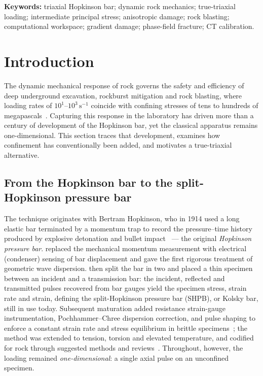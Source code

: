 \documentclass[11pt]{article}
\begin{document}
\noindent\textbf{Keywords:} triaxial Hopkinson bar; dynamic rock mechanics;
true-triaxial loading; intermediate principal stress; anisotropic damage; rock
blasting; computational workspace; gradient damage; phase-field fracture; CT
calibration.

\section{Introduction}\label{sec:intro}

The dynamic mechanical response of rock governs the safety and efficiency of
deep underground excavation, rockburst mitigation and rock blasting, where
loading rates of $10^{1}$--$10^{3}\,\mathrm{s}^{-1}$ coincide with confining
stresses of tens to hundreds of megapascals~\citep{zhang2014,WANG2026106436}. Capturing
this response in the laboratory has driven more than a century of development of
the Hopkinson bar, yet the classical apparatus remains one-dimensional. This
section traces that development, examines how confinement has conventionally been
added, and motivates a true-triaxial alternative.

\subsection{From the Hopkinson bar to the split-Hopkinson pressure bar}

The technique originates with Bertram Hopkinson, who in 1914 used a long elastic
bar terminated by a momentum trap to record the pressure--time history produced
by explosive detonation and bullet impact~\citep{hopkinson1914} --- the original
\emph{Hopkinson pressure bar}. \citet{davies1948} replaced the mechanical
momentum measurement with electrical (condenser) sensing of bar displacement and
gave the first rigorous treatment of geometric wave dispersion.
\citet{kolsky1949} then split the bar in two and placed a thin specimen between
an incident and a transmission bar: the incident, reflected and transmitted
pulses recovered from bar gauges yield the specimen stress, strain rate and
strain, defining the split-Hopkinson pressure bar (SHPB), or Kolsky bar, still in
use today. Subsequent maturation added resistance strain-gauge instrumentation,
Pochhammer--Chree dispersion correction, and pulse shaping to enforce a constant
strain rate and stress equilibrium in brittle specimens~\citep{frew2002}; the
method was extended to tension, torsion and elevated temperature, and codified
for rock through suggested methods and reviews~\citep{zhou2012,zhang2014,WANG2026106436}.
Throughout, however, the loading remained \emph{one-dimensional}: a single axial
pulse on an unconfined specimen.
\end{document}
